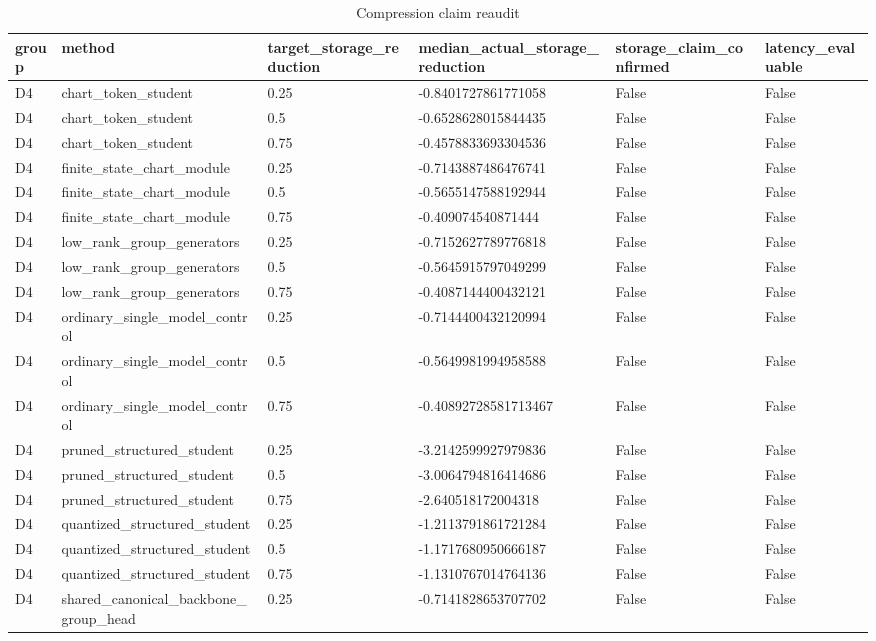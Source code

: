 \begin{table}[t]
\centering
\caption{Compression claim reaudit}
\begin{tabular}{llllll}
\toprule
group & method & target\_storage\_reduction & median\_actual\_storage\_reduction & storage\_claim\_confirmed & latency\_evaluable \\
\midrule
D4 & chart\_token\_student & 0.25 & -0.8401727861771058 & False & False \\
D4 & chart\_token\_student & 0.5 & -0.6528628015844435 & False & False \\
D4 & chart\_token\_student & 0.75 & -0.4578833693304536 & False & False \\
D4 & finite\_state\_chart\_module & 0.25 & -0.7143887486476741 & False & False \\
D4 & finite\_state\_chart\_module & 0.5 & -0.5655147588192944 & False & False \\
D4 & finite\_state\_chart\_module & 0.75 & -0.409074540871444 & False & False \\
D4 & low\_rank\_group\_generators & 0.25 & -0.7152627789776818 & False & False \\
D4 & low\_rank\_group\_generators & 0.5 & -0.5645915797049299 & False & False \\
D4 & low\_rank\_group\_generators & 0.75 & -0.4087144400432121 & False & False \\
D4 & ordinary\_single\_model\_control & 0.25 & -0.7144400432120994 & False & False \\
D4 & ordinary\_single\_model\_control & 0.5 & -0.5649981994958588 & False & False \\
D4 & ordinary\_single\_model\_control & 0.75 & -0.40892728581713467 & False & False \\
D4 & pruned\_structured\_student & 0.25 & -3.2142599927979836 & False & False \\
D4 & pruned\_structured\_student & 0.5 & -3.0064794816414686 & False & False \\
D4 & pruned\_structured\_student & 0.75 & -2.640518172004318 & False & False \\
D4 & quantized\_structured\_student & 0.25 & -1.2113791861721284 & False & False \\
D4 & quantized\_structured\_student & 0.5 & -1.1717680950666187 & False & False \\
D4 & quantized\_structured\_student & 0.75 & -1.1310767014764136 & False & False \\
D4 & shared\_canonical\_backbone\_group\_head & 0.25 & -0.7141828653707702 & False & False \\

\end{tabular}
\end{table}
